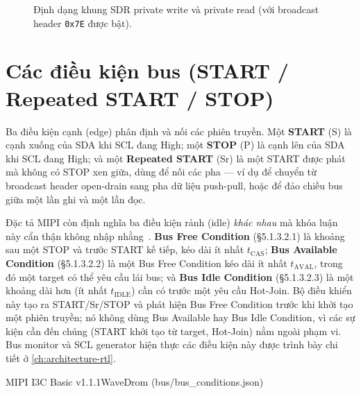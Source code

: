 \begin{figure}[!htb]
\caption{Định dạng khung SDR private write và private read (với broadcast header
\texttt{0x7E} được bật).}
\label{fig:sdr-frames}
\end{figure}

\section{Các điều kiện bus (START / Repeated START / STOP)}
\label{sec:bg-bus-conditions}

Ba điều kiện cạnh (edge) phân định và nối các phiên truyền. Một \textbf{START} (S) là cạnh
xuống của SDA khi SCL đang High; một \textbf{STOP} (P) là cạnh lên của SDA khi SCL đang High;
và một \textbf{Repeated START} (Sr) là một START được phát mà không có STOP xen giữa, dùng để
nối các pha --- ví dụ để chuyển từ broadcast header open-drain sang pha dữ liệu push-pull, hoặc
để đảo chiều bus giữa một lần ghi và một lần đọc.

Đặc tả MIPI còn định nghĩa ba điều kiện rảnh (idle) \emph{khác nhau} mà khóa luận này cẩn thận
không nhập nhằng~\cite{mipi_i3c_basic}. \textbf{Bus Free Condition} (\S5.1.3.2.1) là khoảng sau
một STOP và trước START kế tiếp, kéo dài ít nhất $t_{\mathrm{CAS}}$; \textbf{Bus Available
Condition} (\S5.1.3.2.2) là một Bus Free Condition kéo dài ít nhất $t_{\mathrm{AVAL}}$, trong đó
một target có thể yêu cầu lái bus; và \textbf{Bus Idle Condition} (\S5.1.3.2.3) là một khoảng
dài hơn (ít nhất $t_{\mathrm{IDLE}}$) cần có trước một yêu cầu Hot-Join. Bộ điều khiển này tạo
ra START/Sr/STOP và phát hiện Bus Free Condition trước khi khởi tạo một phiên truyền; nó không
dùng Bus Available hay Bus Idle Condition, vì các sự kiện cần đến chúng (START khởi tạo từ
target, Hot-Join) nằm ngoài phạm vi. Bus monitor và SCL generator hiện thực các điều kiện này
được trình bày chi tiết ở \cref{ch:architecture-rtl}.

  {MIPI I3C Basic v1.1.1}{WaveDrom (bus/bus_conditions.json)}

